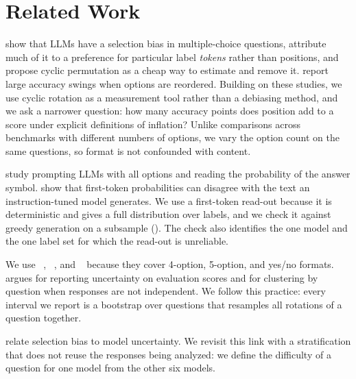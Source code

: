 \section{Related Work}
\label{sec:related}

\citet{zheng2024selectors} show that LLMs have a selection bias in multiple-choice questions, attribute much of it to a preference for particular label \emph{tokens} rather than positions, and propose cyclic permutation as a cheap way to estimate and remove it.
\citet{pezeshkpour2024order} report large accuracy swings when options are reordered.
Building on these studies, we use cyclic rotation as a measurement tool rather than a debiasing method, and we ask a narrower question: how many accuracy points does position add to a score under explicit definitions of inflation?
Unlike comparisons across benchmarks with different numbers of options, we vary the option count on the same questions, so format is not confounded with content.

\citet{robinson2023mcqa} study prompting LLMs with all options and reading the probability of the answer symbol.
\citet{wang2024myanswer} show that first-token probabilities can disagree with the text an instruction-tuned model generates.
We use a first-token read-out because it is deterministic and gives a full distribution over labels, and we check it against greedy generation on a subsample ().
The check also identifies the one model and the one label set for which the read-out is unreliable.

We use \mmlu~\citep{hendrycks2021mmlu}, \csqa~\citep{talmor2019commonsenseqa}, and \boolq~\citep{clark2019boolq} because they cover 4-option, 5-option, and yes/no formats.
\citet{miller2024errorbars} argues for reporting uncertainty on evaluation scores and for clustering by question when responses are not independent.
We follow this practice: every interval we report is a bootstrap over questions that resamples all rotations of a question together.

\citet{zheng2024selectors} relate selection bias to model uncertainty.
We revisit this link with a stratification that does not reuse the responses being analyzed: we define the difficulty of a question for one model from the other six models.
